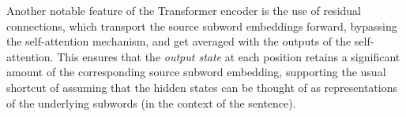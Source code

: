 \documentclass[11pt,a4paper]{article}
\newcommand\eg{e.g.\ }
\newcommand{\word}{\emph{input state}\xspace}
\newcommand{\words}{\emph{input states}\xspace}
\newcommand{\state}{\emph{output state}\xspace}
\def\JL#1{{\color{magenta}JL: \it #1}}
\def\JL#1{}
\begin{document}

Another notable feature of the Transformer encoder is the use of residual connections, which transport the source subword embeddings forward, bypassing the self-attention mechanism, and get averaged with the outputs of the self-attention.
This ensures that the \state at each position retains a significant amount of the corresponding source subword embedding, supporting the usual shortcut of assuming that the hidden states can be thought of as representations of the underlying subwords (in the context of the sentence).





\end{document}
